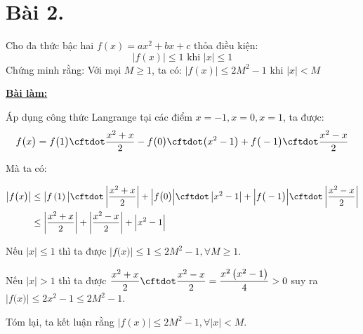 \section*{Bài 2.}

Cho đa thức bậc hai $f(x) = ax^2 + bx + c$ thỏa điều kiện: 
$$|f(x)| \leq 1 \text{ khi } |x| \leq 1$$ 
Chứng minh rằng: Với mọi $M \geq 1$, ta có: $|f(x)| \leq 2M^2 - 1$ khi $|x| < M$


\begin{center}
    \textbf{\underline{Bài làm:}}
\end{center}

Áp dụng công thức Langrange tại các điểm $x = -1, x = 0, x = 1$, ta được:
$$\displaystyle f \big( x \big) = f \big( 1 \big) \cftdot \frac{x^2 + x}{2} - f \big( 0 \big) \cftdot \big( x^2 - 1 \big) + f \big( -1 \big) \cftdot \frac{x^2 - x}{2}$$

Mà ta có:
\begin{center}
\begin{align*}
\displaystyle \left| f \big( x \big) \right| &\leq \big| f \left( 1 \right) \big| \cftdot \left| \frac{x^2 + x}{2} \right| + \Big| f \big( 0 \big) \Big| \cftdot \left| x^2 - 1 \right| + \Big| f \big( -1 \big) \Big| \cftdot \left| \frac{x^2 - x}{2} \right| \\ &\leq \left| \frac{x^2 + x}{2} \right| + \left| \frac{x^2 - x}{2} \right| + \Big| x^2 - 1 \Big|
\end{align*}
\end{center}

Nếu $\big| x \big| \leq 1$ thì ta được $\Big| f \big( x \big) \Big| \leq 1 \leq 2M^2 - 1, \forall M \geq 1$.

Nếu $\big| x \big| > 1$ thì ta được $\displaystyle \frac{x^2 + x}{2} \cftdot \frac{x^2 - x}{2} = \frac{x^2 \left( x^2 - 1 \right)}{4} > 0$ suy ra  $\Big| f \big( x \big) \Big| \leq 2x^2 - 1 \leq 2M^2 - 1$.

Tóm lại, ta kết luận rằng  $|f(x)| \leq 2M^2 - 1, \forall \big| x \big| < M$.
	

\clearpage